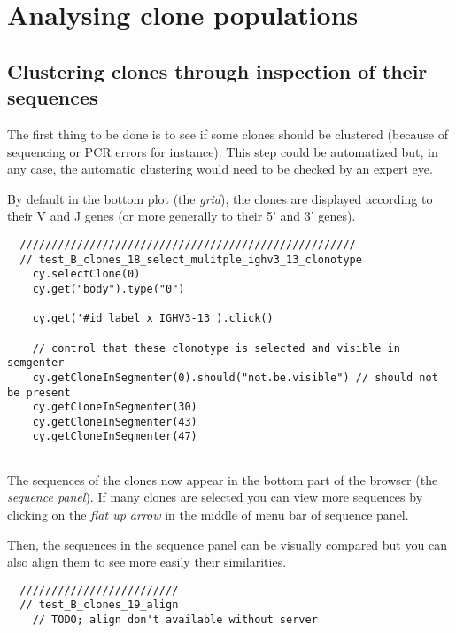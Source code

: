 \section{Analysing clone populations}

\subsection{Clustering clones through inspection of their sequences}

The first thing to be done is to see if some clones should be clustered (because
of sequencing or PCR errors for instance). This step could be automatized
but, in any case, the automatic clustering would need to be checked by an expert
eye.

By default in the bottom plot (the \textit{grid}), the clones
  are displayed according to their V and J genes (or more generally to their
  5' and 3' genes). 

\begin{verbatim}
  /////////////////////////////////////////////////////
  // test_B_clones_18_select_mulitple_ighv3_13_clonotype
    cy.selectClone(0)
    cy.get("body").type("0")

    cy.get('#id_label_x_IGHV3-13').click()

    // control that these clonotype is selected and visible in semgenter
    cy.getCloneInSegmenter(0).should("not.be.visible") // should not be present
    cy.getCloneInSegmenter(30)
    cy.getCloneInSegmenter(43)
    cy.getCloneInSegmenter(47)


\end{verbatim}

The sequences of the clones now appear in the bottom part of the browser (the
\textit{sequence panel}). If many clones are selected you can view more sequences
by clicking on the \textit{flat up arrow} in the middle of menu bar of sequence panel.
 
Then, the sequences in the sequence panel can be visually compared but you can also align
them to see more easily their similarities.


\begin{verbatim}
  /////////////////////////
  // test_B_clones_19_align
    // TODO; align don't available without server


\end{verbatim}


